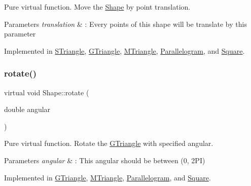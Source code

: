 Pure virtual function. Move the \hyperlink{classShape}{Shape} by point translation. 


\begin{DoxyParams}{Parameters}
{\em translation} & \+: Every points of this shape will be translate by this parameter \\
\hline
\end{DoxyParams}


Implemented in \hyperlink{classSTriangle_ac72888032cde56407193da9435e2fcc0}{S\+Triangle}, \hyperlink{classGTriangle_a6675f3448fca16c1afec576145a9b139}{G\+Triangle}, \hyperlink{classMTriangle_aa21f0514a8af2beba5ecf2ea5a22a4ef}{M\+Triangle}, \hyperlink{classParallelogram_ae8d51f9b629160df31c8a12c28da279e}{Parallelogram}, and \hyperlink{classSquare_a75b2fd22fc3895b83bc20728afb20b10}{Square}.

\mbox{\label{classShape_a2dea8616fd40f2d69fd208715921982a}} 
\subsubsection{\texorpdfstring{rotate()}{rotate()}}
{\footnotesize\ttfamily virtual void Shape\+::rotate (\begin{DoxyParamCaption}\item[{double}]{angular }\end{DoxyParamCaption})\hspace{0.3cm}{\ttfamily [pure virtual]}}



Pure virtual function. Rotate the \hyperlink{classGTriangle}{G\+Triangle} with specified angular. 


\begin{DoxyParams}{Parameters}
{\em angular} & \+: This angular should be between (0, 2\+PI) \\
\hline
\end{DoxyParams}


Implemented in \hyperlink{classGTriangle_ae3ed75bbad4ba7fed68bc06c5834cfbe}{G\+Triangle}, \hyperlink{classMTriangle_a4be29553eeddf99c367b1ec220bc102b}{M\+Triangle}, \hyperlink{classParallelogram_ac498f6a15dea236ecc49bece023d17b0}{Parallelogram}, and \hyperlink{classSquare_a5714e182c30f996b78e74e1badd054a2}{Square}.

\mbox{\label{classShape_a98fa87c6dc4c7045fd6897a8f3bc186c}} 
